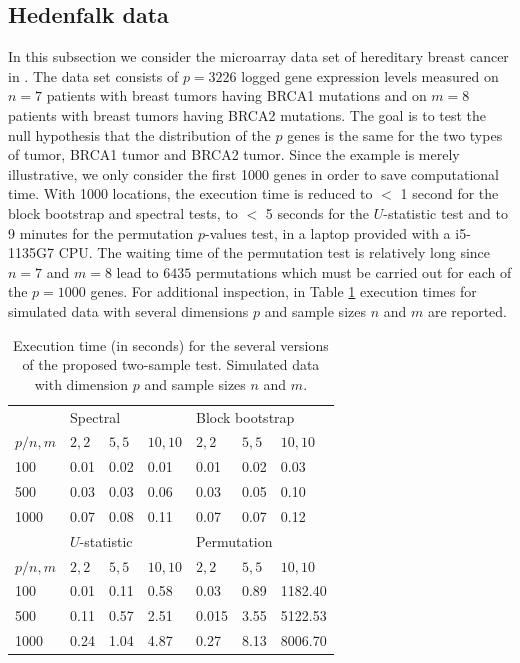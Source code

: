 \subsection{Hedenfalk data}\label{se:he}

In this subsection we consider the microarray data set of
hereditary breast cancer in \cite{He}. The data set
consists of $p=3226$ logged gene 
expression levels measured on
$n=7$ patients with breast tumors
having BRCA1 mutations and on $m=8$
patients with breast tumors
having BRCA2 mutations. The goal is to test the null
hypothesis that the distribution of the $p$ genes is the same
for the two types of tumor, BRCA1 tumor 
and BRCA2 tumor. Since the example is merely illustrative, we only consider the first 1000 genes in order to save computational time. With 1000 locations, the execution time is reduced to $<$ 1 second for the block bootstrap and spectral tests, to $<$ 5 seconds for the $U$-statistic test and to 9 minutes for the permutation $p$-values test,  in a laptop provided
	with a i5-1135G7 CPU. The waiting time of the  permutation test is relatively long since  $n=7$ and $m=8$ lead to $6435$ permutations which must be carried out for each of the $p=1000$ genes. For additional inspection, in Table \ref{ca:time} execution times for simulated data with several dimensions $p$ and sample sizes $n$ and $m$ are reported.

\begin{table}[]
		\begin{center}
	\begin{tabular}{lllllll}
	\hline	& \multicolumn{3}{l}{Spectral}      & \multicolumn{3}{l}{Block bootstrap} \\
		$p/n, m$ & $2,2$     & $5,5$     & $10,10$   & $2,2$     & $5,5$     & $10,10$     \\
		100      & 0.01      & 0.02      & 0.01      & 0.01      & 0.02      & 0.03        \\
		500      & 0.03      & 0.03      & 0.06      & 0.03      & 0.05      & 0.10        \\
		1000     & 0.07      & 0.08      & 0.11      & 0.07      & 0.07      & 0.12        \\
	\hline	& \multicolumn{3}{l}{$U$-statistic} & \multicolumn{3}{l}{Permutation}     \\
		$p/n, m$ & $2,2$     & $5,5$     & $10,10$   & $2,2$     & $5,5$     & $10,10$     \\
		100      & 0.01      & 0.11      & 0.58      & 0.03      & 0.89      & 1182.40     \\
		500      & 0.11      & 0.57      & 2.51      & 0.015     & 3.55      & 5122.53     \\
		1000     & 0.24      & 1.04      & 4.87      & 0.27      & 8.13      & 8006.70  \\
		\hline  
	\end{tabular}
\end{center}
\caption{Execution time (in seconds) for the several versions of the proposed two-sample test. Simulated data with dimension $p$ and sample sizes $n$ and $m$.}	
\label{ca:time}
\end{table}


